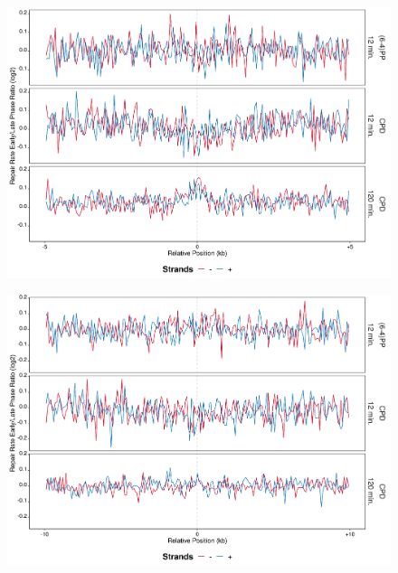 \begin{figure}[H]
\begin{center}
\includegraphics[width=\textwidth]{Chapters/7_appendix/figures/supfig55}
\caption[]{}
\label{supfig:}
\end{center}
\end{figure}

\begin{figure}[H]
\begin{center}
\includegraphics[width=\textwidth]{Chapters/7_appendix/figures/supfig56}
\caption[]{}
\label{supfig:}
\end{center}
\end{figure}

